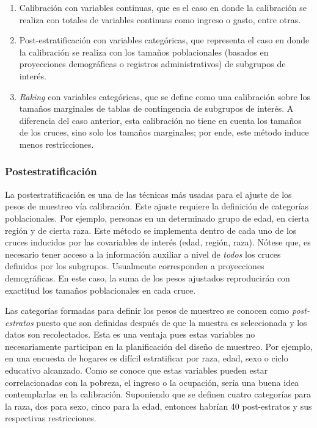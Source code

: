 \documentclass[
  12pt,
  spanish,
]{book}
\providecommand{\tightlist}{%
  \setlength{\itemsep}{0pt}\setlength{\parskip}{0pt}}
\begin{document}
\begin{enumerate}
\def\labelenumi{\arabic{enumi}.}
\tightlist
\item
  Calibración con variables continuas, que es el caso en donde la calibración se realiza con totales de variables continuas como ingreso o gasto, entre otras.
\item
  Post-estratificación con variables categóricas, que representa el caso en donde la calibración se realiza con los tamaños poblacionales (basados en proyecciones demográficas o registros administrativos) de subgrupos de interés.
\item
  \emph{Raking} con variables categóricas, que se define como una calibración sobre los tamaños marginales de tablas de contingencia de subgrupos de interés. A diferencia del caso anterior, esta calibración no tiene en cuenta los tamaños de los cruces, sino solo los tamaños marginales; por ende, este método induce menos restricciones.
\end{enumerate}

\hypertarget{postestratificaciuxf3n}{%
\subsubsection*{Postestratificación}\label{postestratificaciuxf3n}}

La postestratificación es una de las técnicas más usadas para el ajuste de los pesos de muestreo vía calibración. Este ajuste requiere la definición de categorías poblacionales. Por ejemplo, personas en un determinado grupo de edad, en cierta región y de cierta raza. Este método se implementa dentro de cada uno de los cruces inducidos por las covariables de interés (edad, región, raza). Nótese que, es necesario tener acceso a la información auxiliar a nivel de \emph{todos} los cruces definidos por los subgrupos. Usualmente corresponden a proyecciones demográficas. En este caso, la suma de los pesos ajustados reproducirán con exactitud los tamaños poblacionales en cada cruce.

Las categorías formadas para definir los pesos de muestreo se conocen como \emph{post-estratos} puesto que son definidas después de que la muestra es seleccionada y los datos son recolectados. Esta es una ventaja pues estas variables no necesariamente participan en la planificación del diseño de muestreo. Por ejemplo, en una encuesta de hogares es difícil estratificar por raza, edad, sexo o ciclo educativo alcanzado. Como se conoce que estas variables pueden estar correlacionadas con la pobreza, el ingreso o la ocupación, sería una buena idea contemplarlas en la calibración. Suponiendo que se definen cuatro categorías para la raza, dos para sexo, cinco para la edad, entonces habrían 40 post-estratos y sus respectivas restricciones.
\end{document}
